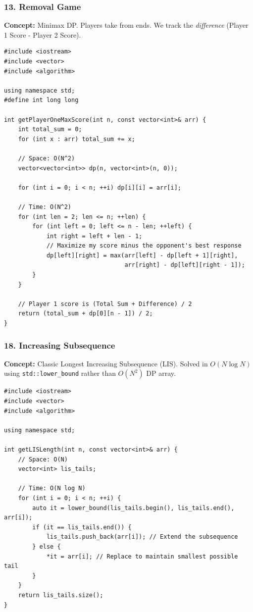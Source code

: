\subsubsection{13. Removal Game}
\textbf{Concept:} Minimax DP. Players take from ends. We track the \textit{difference} (Player 1 Score - Player 2 Score).

\begin{lstlisting}
#include <iostream>
#include <vector>
#include <algorithm>

using namespace std;
#define int long long

int getPlayerOneMaxScore(int n, const vector<int>& arr) {
    int total_sum = 0;
    for (int x : arr) total_sum += x;
    
    // Space: O(N^2)
    vector<vector<int>> dp(n, vector<int>(n, 0));
    
    for (int i = 0; i < n; ++i) dp[i][i] = arr[i];
    
    // Time: O(N^2)
    for (int len = 2; len <= n; ++len) {
        for (int left = 0; left <= n - len; ++left) {
            int right = left + len - 1;
            // Maximize my score minus the opponent's best response
            dp[left][right] = max(arr[left] - dp[left + 1][right], 
                                  arr[right] - dp[left][right - 1]);
        }
    }
    
    // Player 1 score is (Total Sum + Difference) / 2
    return (total_sum + dp[0][n - 1]) / 2;
}
\end{lstlisting}

\subsubsection{18. Increasing Subsequence}
\textbf{Concept:} Classic Longest Increasing Subsequence (LIS). Solved in $O(N \log N)$ using \texttt{std::lower\_bound} rather than $O(N^2)$ DP array.

\begin{lstlisting}
#include <iostream>
#include <vector>
#include <algorithm>

using namespace std;

int getLISLength(int n, const vector<int>& arr) {
    // Space: O(N)
    vector<int> lis_tails;
    
    // Time: O(N log N)
    for (int i = 0; i < n; ++i) {
        auto it = lower_bound(lis_tails.begin(), lis_tails.end(), arr[i]);
        if (it == lis_tails.end()) {
            lis_tails.push_back(arr[i]); // Extend the subsequence
        } else {
            *it = arr[i]; // Replace to maintain smallest possible tail
        }
    }
    return lis_tails.size();
}
\end{lstlisting}

